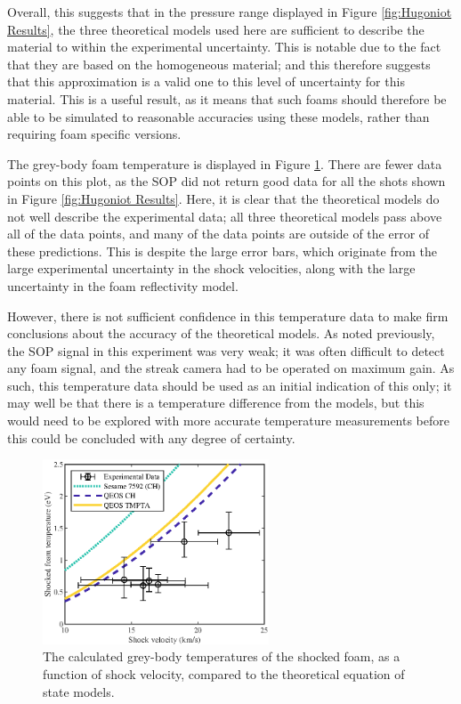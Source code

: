 Overall, this suggests that in the pressure range displayed in Figure \ref{fig:Hugoniot Results}, the three theoretical models used here are sufficient to describe the material to within the experimental uncertainty. This is notable due to the fact that they are based on the homogeneous material; and this therefore suggests that this approximation is a valid one to this level of uncertainty for this material. This is a useful result, as it means that such foams should therefore be able to be simulated to reasonable accuracies using these models, rather than requiring foam specific versions.

The grey-body foam temperature is displayed in Figure \ref{fig:SOP Temp Results}. There are fewer data points on this plot, as the SOP did not return good data for all the shots shown in Figure \ref{fig:Hugoniot Results}. Here, it is clear that the theoretical models do not well describe the experimental data; all three theoretical models pass above all of the data points, and many of the data points are outside of the error of these predictions. This is despite the large error bars, which originate from the large experimental uncertainty in the shock velocities, along with the large uncertainty in the foam reflectivity model.

However, there is not sufficient confidence in this temperature data to make firm conclusions about the accuracy of the theoretical models. As noted previously, the SOP signal in this experiment was very weak; it was often difficult to detect any foam signal, and the streak camera had to be operated on maximum gain. As such, this temperature data should be used as an initial indication of this only; it may well be that there is a temperature difference from the models, but this would need to be explored with more accurate temperature measurements before this could be concluded with any degree of certainty.

\begin{figure} [h!]
\begin{centering}
\includegraphics[width=0.6\textwidth]{figures/Experiment/Temp.eps}%
\caption{\label{fig:SOP Temp Results} The calculated grey-body temperatures of the shocked foam, as a function of shock velocity, compared to the theoretical equation of state models.}
\end{centering}
\end{figure}

